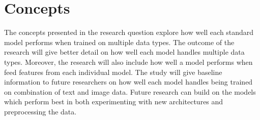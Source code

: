







\section{Concepts}
The concepts presented in the research question explore how well each standard model performs when trained on multiple data types.  The outcome of the research will give better detail on how well each model handles multiple data types.  Moreover, the research will also include how well a model performs when feed features from each individual model.  The study will give baseline information to future researchers on how well each model handles being trained on combination of text and image data.  Future research can build on the models which perform best in both experimenting with new architectures and preprocessing the data.




